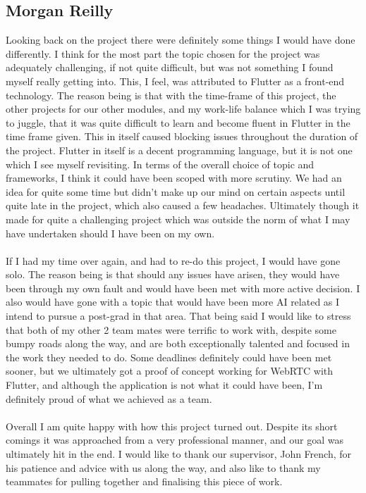 \subsection{Morgan Reilly}
Looking back on the project there were definitely some things I would have done differently. I think for the most part the topic chosen for the project was adequately challenging, if not quite difficult, but was not something I found myself really getting into. This, I feel, was attributed to Flutter as a front-end technology. The reason being is that with the time-frame of this project, the other projects for our other modules, and my work-life balance which I was trying to juggle, that it was quite difficult to learn and become fluent in Flutter in the time frame given. This in itself caused blocking issues throughout the duration of the project. Flutter in itself is a decent programming language, but it is not one which I see myself revisiting. In terms of the overall choice of topic and frameworks, I think it could have been scoped with more scrutiny. We had an idea for quite some time but didn’t make up our mind on certain aspects until quite late in the project, which also caused a few headaches. Ultimately though it made for quite a challenging project which was outside the norm of what I may have undertaken should I have been on my own.
\\\\ If I had my time over again, and had to re-do this project, I would have gone solo. The reason being is that should any issues have arisen, they would have been through my own fault and would have been met with more active decision. I also would have gone with a topic that would have been more AI related as I intend to pursue a post-grad in that area. That being said I would like to stress that both of my other 2 team mates were terrific to work with, despite some bumpy roads along the way, and are both exceptionally talented and focused in the work they needed to do. Some deadlines definitely could have been met sooner, but we ultimately got a proof of concept working for WebRTC with Flutter, and although the application is not what it could have been, I’m definitely proud of what we achieved as a team. 
\\\\ Overall I am quite happy with how this project turned out. Despite its short comings it was approached from a very professional manner, and our goal was ultimately hit in the end. I would like to thank our supervisor, John French, for his patience and advice with us along the way, and also like to thank my teammates for pulling together and finalising this piece of work. 